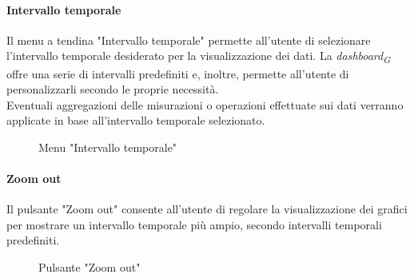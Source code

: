 \paragraph{Intervallo temporale}
Il menu a tendina "Intervallo temporale" permette all'utente di selezionare l'intervallo temporale desiderato per la visualizzazione dei dati. La \textit{dashboard}\textsubscript{\textit{G}} offre una serie di intervalli predefiniti e, inoltre, permette all'utente di personalizzarli secondo le proprie necessità. \\
Eventuali aggregazioni delle misurazioni o operazioni effettuate sui dati verranno applicate in base all'intervallo temporale selezionato.
\begin{figure}[H]
    \centering
    \caption{Menu "Intervallo temporale"}
    \label{fig:my_label}
\end{figure}

\paragraph{Zoom out}
Il pulsante "Zoom out" consente all'utente di regolare la visualizzazione dei grafici per mostrare un intervallo temporale più ampio, secondo intervalli temporali predefiniti. 
\begin{figure}[H]
    \centering
    \caption{Pulsante "Zoom out"}
    \label{fig:my_label}
\end{figure}

